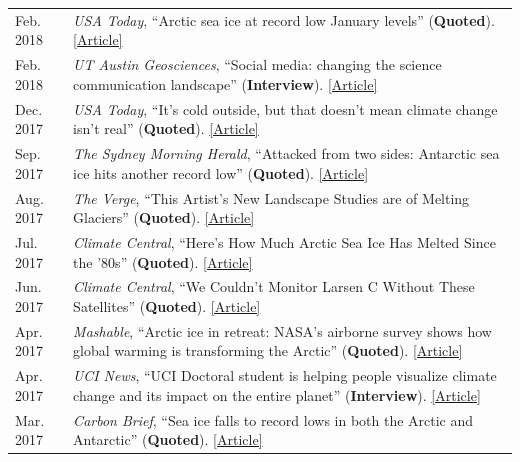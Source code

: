 \documentclass[margin,line,palatino,courier,10pt]{res}
\begin{document}
\begin{resume}
\begin{tabular}{@{}p{0.9in}p{4in}}
Feb. 2018 & \textit{USA Today}, ``Arctic sea ice at record low January levels'' (\textbf{Quoted}). \href{https://www.usatoday.com/story/weather/2018/02/20/arctic-sea-ice-record-low-january-levels/355738002/}{[Article]}\\
Feb. 2018 & \textit{UT Austin Geosciences}, ``Social media: changing the science communication landscape'' (\textbf{Interview}). \href{https://www.jsg.utexas.edu/science-yall/social-media-landscape/}{[Article]}\\
Dec. 2017 & \textit{USA Today}, ``It's cold outside, but that doesn't mean climate change isn't real'' (\textbf{Quoted}). \href{https://www.usatoday.com/story/weather/2017/12/28/its-cold-outside-but-doesnt-mean-climate-change-isnt-real/987948001/}{[Article]}\\
Sep. 2017 & \textit{The Sydney Morning Herald}, ``Attacked from two sides: Antarctic sea ice hits another record low'' (\textbf{Quoted}). \href{http://www.smh.com.au/environment/climate-change/attacked-from-two-sides-antarctic-sea-ice-hits-another-record-low-20170926-gyouuc.html}{[Article]}\\
Aug. 2017 & \textit{The Verge}, ``This Artist's New Landscape Studies are of Melting Glaciers'' (\textbf{Quoted}). \href{https://www.theverge.com/2017/8/22/16171276/anthropocene-nasa-justin-brice-guariglia-photography-climate-change}{[Article]}\\
Jul. 2017 & \textit{Climate Central}, ``Here's How Much Arctic Sea Ice Has Melted Since the '80s'' (\textbf{Quoted}). \href{http://www.climatecentral.org/news/arctic-sea-ice-melt-since-the-80s-21637}{[Article]}\\
Jun. 2017 & \textit{Climate Central}, ``We Couldn't Monitor Larsen C Without These Satellites'' (\textbf{Quoted}). \href{http://www.climatecentral.org/news/larsen-c-monitoring-satellites-21564}{[Article]}\\
Apr. 2017 & \textit{Mashable}, ``Arctic ice in retreat: NASA's airborne survey shows how global warming is transforming the Arctic'' (\textbf{Quoted}). \href{http://mashable.com/2017/04/13/arctic-meltdown-nasa-photos-changing-ice/?utm_cid=hp-n-1#BgdepWyM6Pq3}{[Article]}\\
Apr. 2017 & \textit{UCI News}, ``UCI Doctoral student is helping people visualize climate change and its impact on the entire planet'' (\textbf{Interview}). \href{http://grad.uci.edu/news-and-events/student-spotlights/Zachary-Labe.html}{[Article]}\\
Mar. 2017 & \textit{Carbon Brief}, ``Sea ice falls to record lows in both the Arctic and Antarctic'' (\textbf{Quoted}). \href{https://www.carbonbrief.org/sea-ice-falls-record-lows-arctic-antarctic}{[Article]}\\

\end{tabular}
\end{resume}
\end{document}
